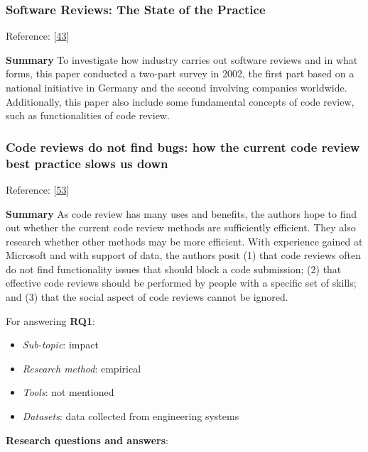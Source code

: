 \documentclass[]{book}
\providecommand{\tightlist}{%
  \setlength{\itemsep}{0pt}\setlength{\parskip}{0pt}}
\begin{document}
\subsubsection{Software Reviews: The State of the
Practice}\label{software-reviews-the-state-of-the-practice}

Reference: {[}\protect\hyperlink{ref-ciolkowski2003software}{43}{]}

\textbf{Summary} To investigate how industry carries out software
reviews and in what forms, this paper conducted a two-part survey in
2002, the first part based on a national initiative in Germany and the
second involving companies worldwide. Additionally, this paper also
include some fundamental concepts of code review, such as
functionalities of code review.

\subsubsection{Code reviews do not find bugs: how the current code
review best practice slows us
down}\label{code-reviews-do-not-find-bugs-how-the-current-code-review-best-practice-slows-us-down}

Reference: {[}\protect\hyperlink{ref-czerwonka2015code}{53}{]}

\textbf{Summary} As code review has many uses and benefits, the authors
hope to find out whether the current code review methods are
sufficiently efficient. They also research whether other methods may be
more efficient. With experience gained at Microsoft and with support of
data, the authors posit (1) that code reviews often do not find
functionality issues that should block a code submission; (2) that
effective code reviews should be performed by people with a specific set
of skills; and (3) that the social aspect of code reviews cannot be
ignored.

For answering \textbf{RQ1}:

\begin{itemize}
\tightlist
\item
  \emph{Sub-topic}: impact
\item
  \emph{Research method}: empirical
\item
  \emph{Tools}: not mentioned
\item
  \emph{Datasets}: data collected from engineering systems
\end{itemize}

\textbf{Research questions and answers}:
\end{document}
